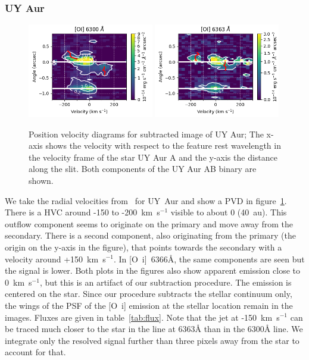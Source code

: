 \documentclass[twocolumn,trackchanges]{aastex63}
\begin{document}
\subsubsection{UY Aur}
\begin{figure}[h!]
\begin{center}
\includegraphics[width=0.49\textwidth]{UY_Aur_6300.png}
\includegraphics[width=0.49\textwidth]{UY_Aur_6363.png}
\caption{Position velocity diagrams for subtracted
image of UY Aur; The x-axis shows the velocity with respect to the
feature rest wavelength in the velocity frame of the star UY Aur
A and the y-axis the distance along the slit. Both components of the UY Aur AB binary are shown.
\label{fig:UYAur}
}
\end{center}
\end{figure}
We take the radial velocities from~\citet{2012ApJ...745..119N} for UY~Aur and
show a PVD in figure~\ref{fig:UYAur}. There is a HVC around -150 to
-200~km~s$^{-1}$ visible to about 0 (40~au). This outflow component
seems to originate on the primary and move away from the secondary. There is a
second component, also originating from the primary (the origin on the y-axis in
the figure), that points towards the secondary with a velocity around
+150~km~s$^{-1}$. In [O~{\sc i}]~6366\AA{}, the same components are seen but
the signal is lower. Both plots in the figures also show apparent emission close to
0~km~s$^{-1}$, but this is an artifact of our subtraction procedure. The
emission is centered on the star. Since our procedure subtracts the stellar
continuum only, the wings of the PSF of the [O~{\sc i}] emission at the stellar
location remain in the images. Fluxes are given in table~\ref{tab:flux}. Note
that the jet at -150~km~s$^{-1}$ can be traced much closer to the star in the
line at 6363\AA{} than in the 6300\AA{} line. We integrate only the resolved  signal further than three pixels away from the star to account for that.
\end{document}
